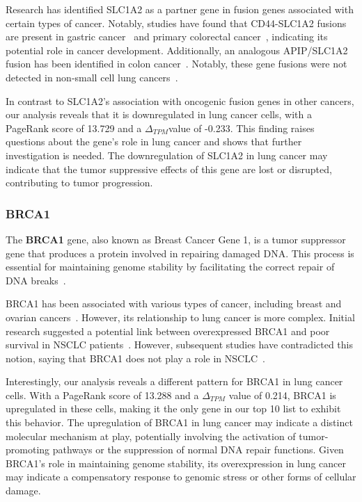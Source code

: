 Research has identified SLC1A2 as a partner gene in fusion genes associated with certain types of cancer.
Notably, studies have found that CD44-SLC1A2 fusions are present in gastric cancer~\cite{Tao2011CD44} and
primary colorectal cancer~\cite{Shinmura2015CD44}, indicating its potential role in cancer development.
Additionally, an analogous APIP/SLC1A2 fusion has been identified in colon cancer~\cite{Giacomini2013Breakpoint}.
Notably, these gene fusions were not detected in non-small cell lung cancers~\cite{Shinmura2015CD44}.

In contrast to SLC1A2's association with oncogenic fusion genes in other cancers,
our analysis reveals that it is downregulated in lung cancer cells,
with a PageRank score of 13.729 and a $\Delta_{TPM}$value of -0.233.
This finding raises questions about the gene's role in lung cancer and shows that further investigation is needed.
The downregulation of SLC1A2 in lung cancer may indicate that the tumor suppressive effects of this gene are lost or disrupted,
contributing to tumor progression.
\newline

\subsubsection*{BRCA1} \label{subsubsec:brca1}
The \textbf{BRCA1} gene, also known as Breast Cancer Gene 1, is a tumor suppressor gene
that produces a protein involved in repairing damaged DNA\@.
This process is essential for maintaining genome stability by facilitating the correct repair of DNA breaks~\cite{NCI2020BRCA1}.

BRCA1 has been associated with various types of cancer, including breast and ovarian cancers~\cite{Lee2020BRCA1}.
However, its relationship to lung cancer is more complex.
Initial research suggested a potential link between overexpressed BRCA1 and
poor survival in NSCLC patients~\cite{Rosell2007BRCA1}.
However, subsequent studies have contradicted this notion,
saying that BRCA1 does not play a role in NSCLC~\cite{Gachechiladze2012BRCA1,Lee2020BRCA1}.

Interestingly, our analysis reveals a different pattern for BRCA1 in lung cancer cells.
With a PageRank score of 13.288 and a $\Delta_{TPM}$ value of 0.214,
BRCA1 is upregulated in these cells, making it the only gene in our top 10 list to exhibit this behavior.
The upregulation of BRCA1 in lung cancer may indicate a distinct molecular mechanism at play,
potentially involving the activation of tumor-promoting pathways or the suppression of normal DNA repair functions.
Given BRCA1's role in maintaining genome stability,
its overexpression in lung cancer may indicate a compensatory response to genomic stress or other forms of cellular damage.
\newline

